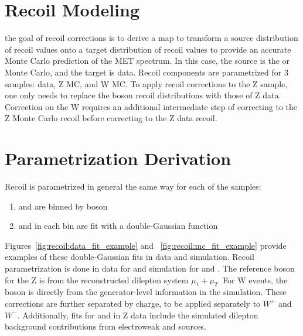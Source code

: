 
\section{Recoil Modeling} \label{ch:recoil:modeling}
the goal of recoil corrections is to derive a map to transform a source distribution of recoil values onto a target distribution of recoil values to provide an accurate Monte Carlo prediction of the MET spectrum. In this case, the source is the \zll or \wlnu Monte Carlo, and the target is data. Recoil components are parametrized for 3 samples: data, Z MC, and W MC. To apply recoil corrections to the Z sample, one only needs to replace the \Z boson recoil distributions with those of Z data. Correction on the W requires an additional intermediate step of correcting to the Z Monte Carlo recoil before correcting to the Z data recoil.

\section{Parametrization Derivation}
Recoil is parametrized in general the same way for each of the samples:
\begin{enumerate}
\item \upar and \uprp are binned by boson \pt
\item \upar and \uprp  in each \pt bin are fit with a double-Gaussian function
\end{enumerate}
Figures~\ref{fig:recoil:data_fit_example}
 and ~\ref{fig:recoil:mc_fit_example} provide examples of these double-Gaussian fits in data and simulation. Recoil parametrization is done in data for \zmm and simulation for \zmm and \wmunu. The reference boson \pt for the Z is from the reconstructed dilepton system $\mu_1+\mu_2$. For W events, the boson \pt is directly from the generator-level information in the simulation. These corrections are further separated by charge, to be applied separately to $W^+$ and $W^-$.
Additionally, fits for \upar and \uprp in Z data include the simulated dilepton background contributions from electroweak and \ttbar sources.





